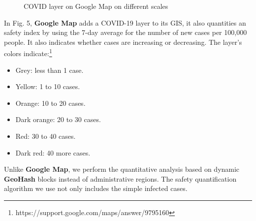 \documentclass[conference]{IEEEtran}
\begin{document}
\begin{figure}[h]
    \centerline{
    }
    \caption{COVID layer on Google Map on different scales}
\end{figure}

In Fig. 5, \textbf{Google Map} adds a COVID-19 layer to its GIS, it also quantities an safety index by using the 7-day average for the number of new cases per 100,000 people.
It also indicates whether cases are increasing or decreasing.
The layer's colors indicate:\footnote{https://support.google.com/maps/answer/9795160}
\begin{itemize}
    \item Grey: less than 1 case.
    \item Yellow: 1 to 10 cases.
    \item Orange: 10 to 20 cases.
    \item Dark orange: 20 to 30 cases.
    \item Red: 30 to 40 cases.
    \item Dark red: 40 more cases.
\end{itemize}

Unlike \textbf{Google Map}, we perform the quantitative analysis based on dynamic \textbf{GeoHash} blocks instead of administrative regions.
The safety quantification algorithm we use not only includes the simple infected cases.
\end{document}
